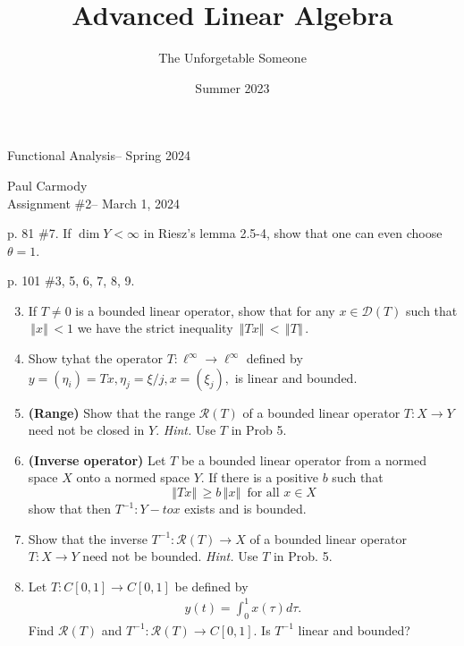 \documentclass[10pt,a4paper]{report}
\title{Advanced Linear Algebra}
\author{The Unforgetable Someone}
\date{Summer 2023}
\newcommand{\CLASSNAME}{Functional Analysis}
\newcommand{\STUDENTNAME}{Paul Carmody}
\newcommand{\ASSIGNMENT}{Assignment \#2}
\newcommand{\DUEDATE}{March 1, 2024}
\newcommand{\SEMESTER}{Spring 2024}
\newcommand{\NORM}[1]{\,\left \Vert #1 \right \Vert\,}
\begin{document}
\begin{center}
	\Large{\CLASSNAME -- \SEMESTER} \\
\end{center}
\begin{center}
	\STUDENTNAME \\
	\ASSIGNMENT -- \DUEDATE\\
\end{center} 
\vskip 0.5cm
p. 81 \#7.  If $\dim Y < \infty$ in Riesz's lemma 2.5-4, show that one can even choose $\theta = 1$.

\newpage
 p. 101 \#3, 5, 6, 7, 8, 9. 
\begin{enumerate}
	\setcounter{enumi}{2}
	\item If $T \ne 0$ is a bounded linear operator, show that for any $x \in \mathcal{D}(T)$ such that $\NORM{x} < 1$ we have the strict inequality $\NORM{Tx} < \NORM{T}$.
	
	\setcounter{enumi}{4}
	\item Show tyhat the operator $T: \ell^\infty \to \ell^\infty$ defined by $y = (\eta_i)=Tx, \eta_j=\xi/j, x=(\xi_j),$ is linear and bounded.
	\item \textbf{(Range)} Show that the range $\mathcal{R}(T)$ of a bounded linear operator $T: X\to Y$ need not be closed in $Y$.  \textit{Hint.} Use $T$ in Prob 5.
	\item \textbf{(Inverse operator)} Let $T$ be a bounded linear operator from a normed space $X$ onto a normed space $Y$.  If there is a positive $b$ such that $$ \NORM{Tx}\ge b\NORM{x} \text{ for all } x \in X$$ show that then $T^{-1}:Y-to x$ exists and is bounded.
	\item Show that the inverse $T^{-1}:\mathcal{R}(T)\to X$ of a bounded linear operator $T:X\to Y$ need not be bounded.  \textit{Hint.}  Use $T$ in Prob. 5.
	\item Let $T: C[0,1] \to C[0,1]$ be defined by 
	\begin{align*}
		y(t) = \int_0^1 x(\tau) d\tau.
	\end{align*}Find $\mathcal{R}(T)$ and $T^{-1}:\mathcal{R}(T)\to C[0,1]$.  Is $T^{-1}$ linear and bounded?
\end{enumerate}
\newpage 
\end{document}
